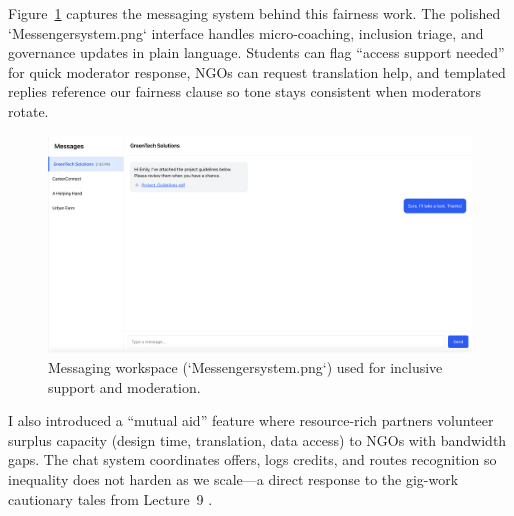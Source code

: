 Figure~\ref{fig:chat-system} captures the messaging system behind this fairness work. The polished `Messengersystem.png` interface handles micro-coaching, inclusion triage, and governance updates in plain language. Students can flag ``access support needed'' for quick moderator response, NGOs can request translation help, and templated replies reference our fairness clause so tone stays consistent when moderators rotate.

\begin{figure}[h]
  \centering
  \includegraphics[width=0.85\linewidth]{figures/Messengersystem.png}
  \caption{Messaging workspace (`Messengersystem.png`) used for inclusive support and moderation.}
  \label{fig:chat-system}
\end{figure}

I also introduced a ``mutual aid'' feature where resource-rich partners volunteer surplus capacity (design time, translation, data access) to NGOs with bandwidth gaps. The chat system coordinates offers, logs credits, and routes recognition so inequality does not harden as we scale---a direct response to the gig-work cautionary tales from Lecture~9 \citep{Lecture09}.
